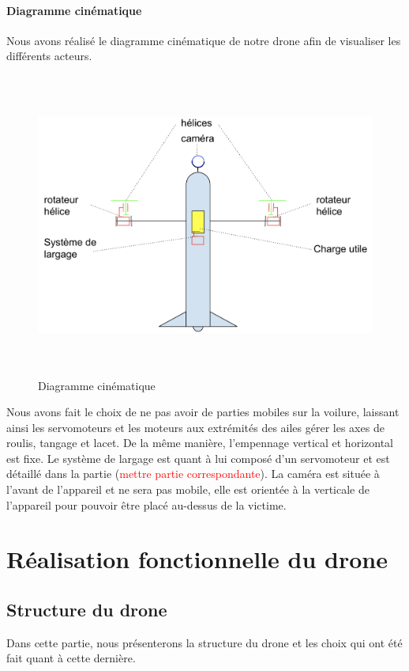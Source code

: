 \documentclass[a4paper,12pt,french]{report}
\begin{document}
\subsubsection{Diagramme cinématique}
Nous avons réalisé le diagramme cinématique de notre drone afin de visualiser les différents acteurs.
\begin{figure}[h]
    \centering
    \includegraphics[height=10cm]{figures/cine.png}
    \caption{Diagramme cinématique}
    \label{cine}
\end{figure}

Nous avons fait le choix de ne pas avoir de parties mobiles sur la voilure, laissant ainsi les servomoteurs et les moteurs aux extrémités des ailes gérer les axes de roulis, tangage et lacet. De la même manière, l’empennage vertical et horizontal est fixe. Le système de largage est quant à lui composé d’un servomoteur et est détaillé dans la partie (\textcolor{red}{mettre partie correspondante}). La caméra est située à l’avant de l’appareil et ne sera pas mobile, elle est orientée à la verticale de l’appareil pour pouvoir être placé au-dessus de la victime.

\chapter{Réalisation fonctionnelle du drone}

\section{Structure du drone}

Dans cette partie, nous présenterons la structure du drone et les choix qui ont été fait quant à cette dernière.
\end{document}

